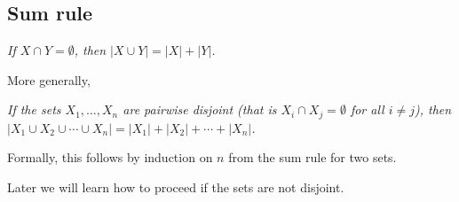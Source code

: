 \subsection{Sum rule}
\begin{center}
\emph{If $X \cap Y = \emptyset$, then $|X \cup Y| = |X| + |Y|$.}
\end{center}

More generally,
\begin{center}
\parbox{.9\textwidth}{\emph{If the sets $X_1, \ldots, X_n$ are pairwise disjoint
(that is $X_i \cap X_j = \emptyset$ for all $i \ne j$),
then $|X_1 \cup X_2 \cup \cdots \cup X_n| = |X_1| + |X_2| + \cdots + |X_n|$.}}
\end{center}
Formally, this follows by induction on $n$ from the sum rule for two sets.

Later we will learn how to proceed if the sets are not disjoint.
